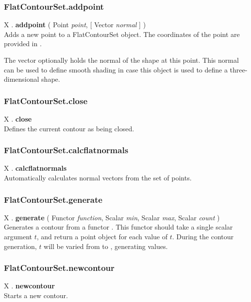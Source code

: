 \subsubsection{FlatContourSet.addpoint \label{F:FlatContourSet:addpoint}}
X . \textbf{addpoint} ( Point \textit{point},  [ Vector \textit{normal} ] ) \\
Adds a new point to a FlatContourSet object. The coordinates of the point are provided in .

The vector  optionally holds the normal of the shape at this point. This normal can be used to define smooth shading in case this object is used to define a three-dimensional shape.

\subsubsection{FlatContourSet.close \label{F:FlatContourSet:close}}
X . \textbf{close} \\
Defines the current contour as being closed.

\subsubsection{FlatContourSet.calcflatnormals \label{F:FlatContourSet:calcflatnormals}}
X . \textbf{calcflatnormals} \\
Automatically calculates normal vectors from the set of points.

\subsubsection{FlatContourSet.generate \label{F:FlatContourSet:generate}}
X . \textbf{generate} ( Functor \textit{function}, Scalar \textit{min}, Scalar \textit{max}, Scalar \textit{count} ) \\
Generates a contour from a functor . This functor should take a single scalar argument $t$, and return a point object for each value of $t$. During the contour generation, $t$ will be varied from  to , generating  values.

\subsubsection{FlatContourSet.newcontour \label{F:FlatContourSet:newcontour}}
X . \textbf{newcontour} \\
Starts a new contour.

